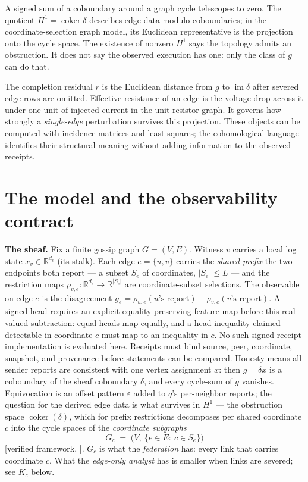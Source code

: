 \documentclass[11pt,a4paper]{article}
\begin{document}
A signed sum of a coboundary around a graph cycle telescopes to zero. The quotient
$H^1=\operatorname{coker}\delta$ describes edge data modulo coboundaries; in the coordinate-selection graph model,
its Euclidean representative is the projection onto the cycle space. The existence of nonzero $H^1$ says the topology
admits an obstruction. It does not say the observed execution has one: only the class of $g$ can do that.

The completion residual $r$ is the Euclidean distance from $g$ to $\operatorname{im}\delta$ after severed edge rows
are omitted. Effective resistance of an edge is the voltage drop across it under one unit of injected current in the
unit-resistor graph. It governs how strongly a \emph{single-edge} perturbation survives this projection. These objects
can be computed with incidence matrices and least squares; the cohomological language identifies their structural
meaning without adding information to the observed receipts.

\section{The model and the observability contract}\label{sec:model}

\textbf{The sheaf.} Fix a finite gossip graph $G=(V,E)$. Witness $v$ carries a local log state $x_v\in\mathbb{R}^{d_v}$ (its
stalk). Each edge $e=\{u,v\}$ carries the \emph{shared prefix} the two endpoints both report --- a subset $S_e$ of
coordinates, $|S_e|\le L$ --- and the restriction maps $\rho_{v,e}:\mathbb{R}^{d_v}\to\mathbb{R}^{|S_e|}$ are
coordinate-subset selections. The observable on edge $e$ is the disagreement
$g_e=\rho_{u,e}(\text{$u$'s report})-\rho_{v,e}(\text{$v$'s report})$. A signed head requires an explicit
equality-preserving feature map before this real-valued subtraction: equal heads map equally, and a head inequality
claimed detectable in coordinate $c$ must map to an inequality in $c$. No such signed-receipt implementation is evaluated
here. Receipts must bind source, peer, coordinate, snapshot, and provenance before statements can be compared. Honesty means all sender reports are consistent with one vertex assignment
$x$: then $g=\delta x$ is a coboundary of the sheaf coboundary $\delta$, and every cycle-sum of $g$ vanishes. Equivocation is
an offset pattern $\varepsilon$ added to $q$'s per-neighbor reports; the question for the derived edge data is what survives
in $H^1$ --- the obstruction space $\operatorname{coker}(\delta)$, which for
prefix restrictions decomposes per shared coordinate $c$ into the cycle spaces of the \emph{coordinate subgraphs}
\[
G_c \;=\; \bigl(V,\ \{e\in E:\ c\in S_e\}\bigr)
\]
[verified framework, \cite{curry,hansen-ghrist}]. $G_c$ is what the \emph{federation} has: every link that carries
coordinate $c$. What the \emph{edge-only analyst} has is smaller when links are severed; see $K_c$ below.
\end{document}
